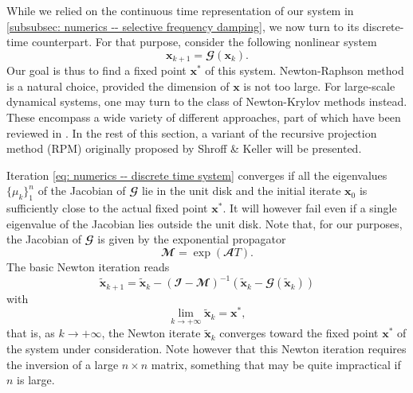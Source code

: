     While we relied on the continuous time representation of our system in \textsection \ref{subsubsec: numerics -- selective frequency damping}, we now turn to its discrete-time counterpart. For that purpose, consider the following nonlinear system
    \begin{equation}
      \mathbf{x}_{k+1} = \mathbfcal{G}\left( \mathbf{x}_k \right).
      \label{eq: numerics -- discrete time system}
    \end{equation}
    Our goal is thus to find a fixed point $\mathbf{x}^*$ of this system. Newton-Raphson method is a natural choice, provided the dimension of $\mathbf{x}$ is not too large. For large-scale dynamical systems, one may turn to the class of Newton-Krylov methods instead. These encompass a wide variety of different approaches, part of which have been reviewed in \cite{jcp:knoll:2004}. In the rest of this section, a variant of the recursive projection method (RPM) originally proposed by Shroff \& Keller \cite{siam:shroff:1993} will be presented.

    Iteration \eqref{eq: numerics -- discrete time system} converges if all the eigenvalues $\{ \mu_k \}_1^n$ of the Jacobian of $\mathbfcal{G}$ lie in the unit disk and the initial iterate $\mathbf{x}_0$ is sufficiently close to the actual fixed point $\mathbf{x}^*$. It will however fail even if a single eigenvalue of the Jacobian lies outside the unit disk. Note that, for our purposes, the Jacobian of $\mathbfcal{G}$ is given by the exponential propagator
    \begin{equation}
      \mathbfcal{M} = \exp \left( \mathbfcal{A} T \right).
      \label{eq: numerics -- jacobian matrix}
    \end{equation}
    The basic Newton iteration reads
    \begin{equation}
      \tilde{\mathbf{x}}_{k+1} = \tilde{\mathbf{x}}_k - \left( \mathbfcal{I} - \mathbfcal{M} \right)^{-1} \left( \tilde{\mathbf{x}}_k - \mathbfcal{G}(\tilde{\mathbf{x}}_k) \right)
    \end{equation}
    with $$\lim_{k \to +\infty} \tilde{\mathbf{x}}_k = \mathbf{x}^*,$$
    that is, as $k \to +\infty$, the Newton iterate $\tilde{\mathbf{x}}_k$ converges toward the fixed point $\mathbf{x}^*$ of the system under consideration. Note however that this Newton iteration requires the inversion of a large $n \times n$ matrix, something that may be quite impractical if $n$ is large.

